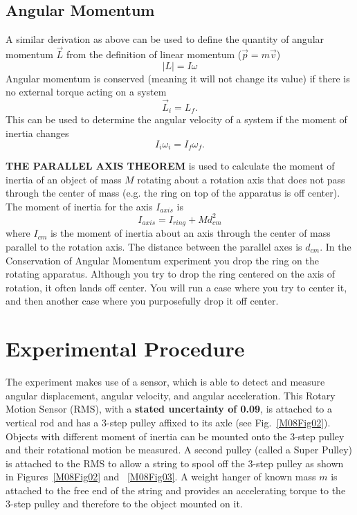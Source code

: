 \subsection{Angular Momentum}

A similar derivation as above can be used to define the quantity of angular momentum $\vec{L}$ from the definition of linear momentum ($\vec{p} = m \vec{v}$)
\[
|L| = I \omega
\]
Angular momentum is conserved (meaning it will not change its value) if there is no external torque acting on a system
\[
\vec{L}_i = {L}_f.
\]
This can be used to determine the angular velocity of a system if the moment of inertia changes
\begin{equation}
  I_i \omega_i = I_f \omega_f.
\end{equation}


\textbf{THE PARALLEL AXIS THEOREM} is used to calculate the moment of inertia of an object of mass $M$ rotating about a rotation axis that does not pass through the center of mass (e.g. the ring on top of the apparatus is off center). The moment of inertia for the axis ${I_{axis}}$  is
\begin{equation}
\label{M7RotationalMotion_OffAxis}
    {I_{axis}} = {I_{ring}} + M d_{cm}^2
\end{equation}
where ${I_{cm}}$ is the moment of inertia about an axis through the center of mass parallel to the rotation axis. The distance between the parallel axes is ${d_{cm}}$. In the Conservation of Angular Momentum experiment you drop the ring on the rotating apparatus.  Although you try to drop the ring centered on the axis of rotation, it often lands off center. You will run a case where you try to center it, and then another case where you purposefully drop it off center.


\section{Experimental Procedure}

The experiment makes use of a sensor, which is able to detect and measure angular displacement, angular velocity, and angular acceleration. This Rotary Motion Sensor (RMS), with a \textbf{stated uncertainty of 0.09\degree}, is attached to a vertical rod and has a 3-step pulley affixed to its axle (see Fig.~\ref{M08Fig02}). Objects with different moment of inertia can be mounted onto the 3-step pulley and their rotational motion be measured. A second pulley (called a Super Pulley) is attached to the RMS to allow a string to spool off the 3-step pulley as shown in Figures~\ref{M08Fig02} and ~\ref{M08Fig03}. A weight hanger of known mass $m$ is attached to the free end of the string and provides an accelerating torque to the 3-step pulley and therefore to the object mounted on it.

